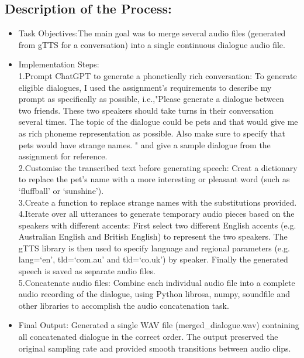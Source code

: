 \documentclass{../labbook}
\begin{document}
\begin{solution}
\subsection{Description of the Process:}
\begin{itemize}
\item Task Objectives:The main goal was to merge several audio files (generated from gTTS for a conversation) into a single continuous dialogue audio file.
\item Implementation Steps:\\
1.Prompt ChatGPT to generate a phonetically rich conversation: To generate eligible dialogues, I used the assignment's requirements to describe my prompt as specifically as possible, i.e.,"Please generate a dialogue between two friends. These two speakers should take turns in their conversation several times. The topic of the dialogue could be pets and that would give me as rich phoneme representation as possible. Also make sure to specify that pets would have strange names. " and give a sample dialogue from the assignment for reference.\\
2.Customise the transcribed text before generating speech: Creat a dictionary to replace the pet's name with a more interesting or pleasant word (such as ‘fluffball’ or ‘sunshine’).\\
3.Create a function to replace strange names with the substitutions provided.\\
4.Iterate over all utterances to generate temporary audio pieces based on the speakers with different accents: First select two different English accents (e.g. Australian English and British English) to represent the two speakers. The gTTS library is then used to specify language and regional parameters (e.g. lang=‘en’, tld=‘com.au’ and tld=‘co.uk’) by speaker. Finally the generated speech is saved as separate audio files.\\
5.Concatenate audio files: Combine each individual audio file into a complete audio recording of the dialogue, using Python librosa, numpy, soundfile and other libraries to accomplish the audio concatenation task.
\item Final Output: Generated a single WAV file (merged\_dialogue.wav) containing all concatenated dialogue in the correct order. The output preserved the original sampling rate and provided smooth transitions between audio clips.

\end{itemize}
\end{solution}
\end{document}
